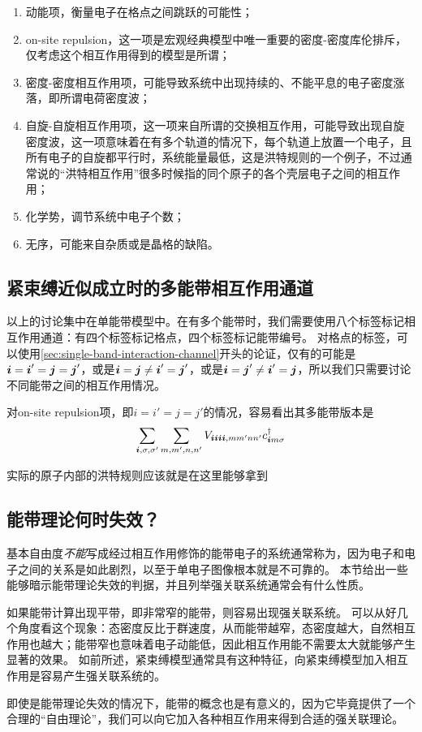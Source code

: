 \begin{enumerate}
    \item 动能项，衡量电子在格点之间跳跃的可能性；
    \item on-site repulsion，这一项是宏观经典模型中唯一重要的密度-密度库伦排斥，仅考虑这个相互作用得到的模型是所谓；
    \item 密度-密度相互作用项，可能导致系统中出现持续的、不能平息的电子密度涨落，即所谓电荷密度波；
    \item 自旋-自旋相互作用项，这一项来自所谓的交换相互作用，可能导致出现自旋密度波，这一项意味着在有多个轨道的情况下，每个轨道上放置一个电子，且所有电子的自旋都平行时，系统能量最低，这是洪特规则的一个例子，不过通常说的“洪特相互作用”很多时候指的同个原子的各个壳层电子之间的相互作用；
    \item 化学势，调节系统中电子个数；
    \item 无序，可能来自杂质或是晶格的缺陷。
\end{enumerate}

\subsection{紧束缚近似成立时的多能带相互作用通道}

以上的讨论集中在单能带模型中。在有多个能带时，我们需要使用八个标签标记相互作用通道：有四个标签标记格点，四个标签标记能带编号。
对格点的标签，可以使用\autoref{sec:single-band-interaction-channel}开头的论证，仅有的可能是$\vb*{i}=\vb*{i}'=\vb*{j}=\vb*{j}'$，或是$\vb*{i}=\vb*{j} \neq \vb*{i}'=\vb*{j}'$，或是$\vb*{i}=\vb*{j}' \neq \vb*{i}' = \vb*{j}$，所以我们只需要讨论不同能带之间的相互作用情况。

对on-site repulsion项，即$i=i'=j=j'$的情况，容易看出其多能带版本是
\[
    \sum_{\vb*{i}, \sigma, \sigma'} \sum_{m, m', n, n'} V_{\vb*{i} \vb*{i} \vb*{i} \vb*{i},mm' nn'} c^\dagger_{\vb*{i} m \sigma} 
\]

实际的原子内部的洪特规则应该就是在这里能够拿到

\subsection{能带理论何时失效？}

基本自由度\emph{不能}写成经过相互作用修饰的能带电子的系统通常称为，因为电子和电子之间的关系是如此剧烈，以至于单电子图像根本就是不可靠的。
本节给出一些能够暗示能带理论失效的判据，并且列举强关联系统通常会有什么性质。

如果能带计算出现平带，即非常窄的能带，则容易出现强关联系统。
可以从好几个角度看这个现象：态密度反比于群速度，从而能带越窄，态密度越大，自然相互作用也越大；能带窄也意味着电子动能低，因此相互作用能不需要太大就能够产生显著的效果。
如前所述，紧束缚模型通常具有这种特征，向紧束缚模型加入相互作用是容易产生强关联系统的。

即使是能带理论失效的情况下，能带的概念也是有意义的，因为它毕竟提供了一个合理的“自由理论”，我们可以向它加入各种相互作用来得到合适的强关联理论。
